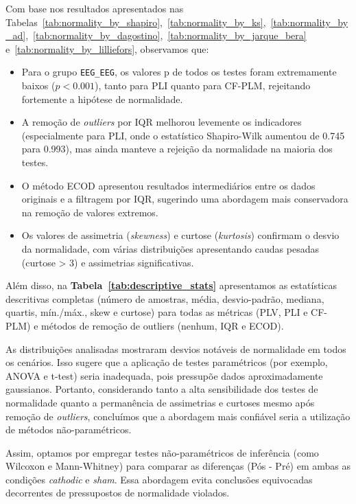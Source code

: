Com base nos resultados apresentados nas Tabelas~\ref{tab:normality_by_shapiro},~\ref{tab:normality_by_ks},~\ref{tab:normality_by_ad},~\ref{tab:normality_by_dagostino},~\ref{tab:normality_by_jarque_bera} e~\ref{tab:normality_by_lilliefors}, observamos que:
\begin{itemize}
    \item Para o grupo \texttt{EEG\_EEG}, os valores p de todos os testes foram extremamente baixos ($p < 0.001$), tanto para PLI quanto para CF-PLM, rejeitando fortemente a hipótese de normalidade.
    \item A remoção de \textit{outliers} por IQR melhorou levemente os indicadores (especialmente para PLI, onde o estatístico Shapiro-Wilk aumentou de 0.745 para 0.993), mas ainda manteve a rejeição da normalidade na maioria dos testes.  
    \item O método ECOD apresentou resultados intermediários entre os dados originais e a filtragem por IQR, sugerindo uma abordagem mais conservadora na remoção de valores extremos.
    \item Os valores de assimetria (\textit{skewness}) e curtose (\textit{kurtosis}) confirmam o desvio da normalidade, com várias distribuições apresentando caudas pesadas (curtose > 3) e assimetrias significativas.
\end{itemize}

Além disso, na \textbf{Tabela~\ref{tab:descriptive_stats}} apresentamos as estatísticas descritivas completas (número de amostras, média, desvio-padrão, mediana, quartis, mín./máx., skew e curtose) para todas as métricas (PLV, PLI e CF-PLM) e métodos de remoção de outliers (nenhum, IQR e ECOD).

As distribuições analisadas mostraram desvios notáveis de normalidade em todos os cenários. Isso sugere que a aplicação de testes paramétricos (por exemplo, ANOVA e t-test) seria inadequada, pois pressupõe dados aproximadamente gaussianos. Portanto, considerando tanto a alta sensibilidade dos testes de normalidade quanto a permanência de assimetrias e curtoses mesmo após remoção de \textit{outliers}, concluímos que a abordagem mais confiável seria a utilização de métodos não-paramétricos.

Assim, optamos por empregar testes não-paramétricos de inferência (como Wilcoxon e Mann-Whitney) para comparar as diferenças (Pós - Pré) em ambas as condições \textit{cathodic} e \textit{sham}. Essa abordagem evita conclusões equivocadas decorrentes de pressupostos de normalidade violados.


